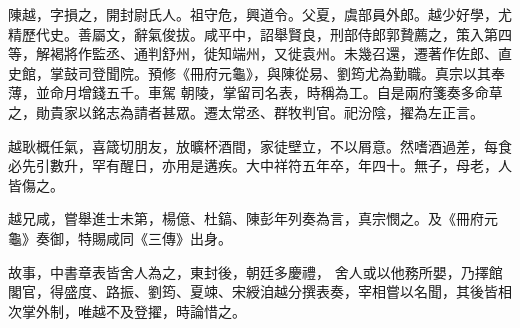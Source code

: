\begin{pinyinscope}
 陳越，字損之，開封尉氏人。祖守危，興道令。父夏，虞部員外郎。越少好學，尤精歷代史。善屬文，辭氣俊拔。咸平中，詔舉賢良，刑部侍郎郭贄薦之，策入第四等，解褐將作監丞、通判舒州，徙知端州，又徙袁州。未幾召還，遷著作佐郎、直史館，掌鼓司登聞院。預修《冊府元龜》，與陳從易、劉筠尤為勤職。真宗以其奉薄，並命月增錢五千。車駕
 朝陵，掌留司名表，時稱為工。自是兩府箋奏多命草之，勛貴家以銘志為請者甚眾。遷太常丞、群牧判官。祀汾陰，擢為左正言。



 越耿概任氣，喜箴切朋友，放曠杯酒間，家徒壁立，不以屑意。然嗜酒過差，每食必先引數升，罕有醒日，亦用是遘疾。大中祥符五年卒，年四十。無子，母老，人皆傷之。



 越兄咸，嘗舉進士未第，楊億、杜鎬、陳彭年列奏為言，真宗憫之。及《冊府元龜》奏御，特賜咸同《三傳》出身。



 故事，中書章表皆舍人為之，東封後，朝廷多慶禮，
 舍人或以他務所嬰，乃擇館閣官，得盛度、路振、劉筠、夏竦、宋綬洎越分撰表奏，宰相嘗以名聞，其後皆相次掌外制，唯越不及登擢，時論惜之。



\end{pinyinscope}
